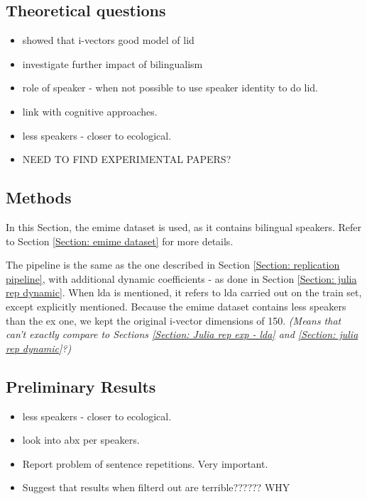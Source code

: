 \subsection{Theoretical questions}

\begin{itemize}
    \renewcommand\labelitemi{--}
    \item showed that i-vectors good model of \acrshort{lid}
    \item investigate further impact of bilingualism
    \item role of speaker - when not possible to use speaker identity to do lid. 
    \item link with cognitive approaches.
    \item less speakers - closer to ecological. 
    \item NEED TO FIND EXPERIMENTAL PAPERS?
\end{itemize}


\subsection{Methods}


In this Section, the \acrshort{emime} dataset is used, as it contains bilingual speakers. Refer to Section \ref{Section: emime dataset} for more details.
\bigskip
\par \noindent The pipeline is the same as the one described in Section \ref{Section: replication pipeline}, with additional dynamic coefficients - as done in Section \ref{Section: julia rep dynamic}. When \acrshort{lda} is mentioned, it refers to \acrshort{lda} carried out on the train set, except explicitly mentioned. Because the \acrshort{emime} dataset contains less speakers than the \acrshort{ex} one, we kept the original i-vector dimensions of 150. \textit{(Means that can't exactly compare to Sections \ref{Section: Julia rep exp - lda} and \ref{Section: julia rep dynamic}?)}


\subsection{Preliminary Results}


\begin{itemize}
    \renewcommand\labelitemi{--}
    \item less speakers - closer to ecological. 
    \item look into abx per speakers. 
    \item Report problem of sentence repetitions. Very important. 
    \item Suggest that results when filterd out are terrible?????? WHY

\end{itemize}



